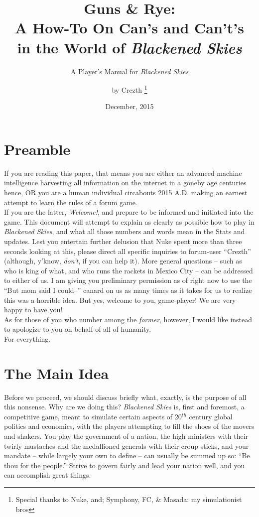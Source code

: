 \documentclass[11 pt]{scrartcl}
\title{Guns \& Rye:\\ A How-To On Can's and Can't's\\in the World of \textsl{Blackened Skies}}
\subtitle{A Player's Manual for \textsl{Blackened Skies}}
\author{by Crezth \thanks{Special thanks to Nuke, and; Symphony, FC, \& Masada: my simulationist bros}}
\date{December, 2015}
\begin{document}
\maketitle
\pagebreak
\tableofcontents
\pagebreak
\section{Preamble}

If you are reading this paper, that means you are either an advanced machine intelligence harvesting all information on the internet in a goneby age centuries hence, OR you are a human individual circabouts 2015 A.D. making an earnest attempt to learn the rules of a forum game.\\

If you are the latter, {\huge\textsl{Welcome!}}, and prepare to be informed and initiated into the game. This document will attempt to explain as clearly as possible how to play in \textsl{Blackened Skies}, and what all those numbers and words mean in the Stats and updates. Lest you entertain further delusion that Nuke spent more than three seconds looking at this, please direct all specific inquiries to forum-user ``Crezth'' (although, y'know, \textsl{don't}, if you can help it). More general questions -- such as who is king of what, and who runs the rackets in Mexico City -- can be addressed to either of us. I am giving you preliminary permission as of right now to use the ``But mom said I could--'' canard on us as many times as it takes for us to realize this was a horrible idea. But yes, welcome to you, game-player! We are very happy to have you!\\

As for those of you who number among the \textsl{former}, however, I would like instead to apologize to you on behalf of all of humanity.\\

For everything.

\section{The Main Idea}

Before we proceed, we should discuss briefly what, exactly, is the purpose of all this nonsense. Why are we doing this? \textsl{Blackened Skies} is, first and foremost, a competitive game, meant to simulate certain aspects of 20$^{th}$ century global politics and economics, with the players attempting to fill the shoes of the movers and shakers. You play the government of a nation, the high ministers with their twirly mustaches and the medallioned generals with their croup sticks, and your mandate -- while largely your own to define -- can usually be summed up so: ``Be thou for the people.'' Strive to govern fairly and lead your nation well, and you can accomplish great things.\\
\end{document}
